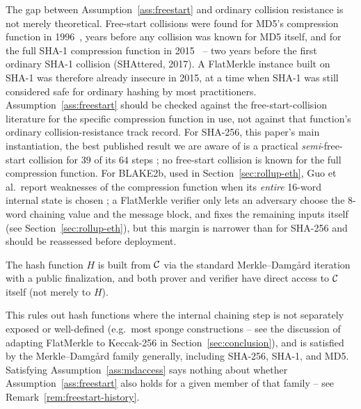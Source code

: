\begin{remark}
\label{rem:freestart-history}
The gap between Assumption~\ref{ass:freestart} and ordinary collision
resistance is not merely theoretical. Free-start collisions were found for
MD5's compression function in 1996~\citep{dobbertin1996}, years before any
collision was known for MD5 itself, and for the full SHA-1 compression
function in 2015~\citep{stevens2015shappening} -- two years before the
first ordinary SHA-1 collision (SHAttered, 2017). A FlatMerkle instance
built on SHA-1 was therefore already insecure in 2015, at a time when
SHA-1 was still considered safe for ordinary hashing by most practitioners.
Assumption~\ref{ass:freestart} should be checked against the
free-start-collision literature for the specific compression function in
use, not against that function's ordinary collision-resistance track
record. For SHA-256, this paper's main instantiation, the best published
result we are aware of is a practical \emph{semi}-free-start collision
for $39$ of its $64$ steps \citep{li2024sha2}; no free-start collision is
known for the full compression function. For BLAKE2b, used in
Section~\ref{sec:rollup-eth}, Guo et al.\ report weaknesses of the
compression function when its \emph{entire} 16-word internal state is
chosen \citep{guo2013blake2}; a FlatMerkle verifier only lets an adversary
choose the 8-word chaining value and the message block, and fixes the
remaining inputs itself (see Section~\ref{sec:rollup-eth}), but this
margin is narrower than for SHA-256 and should be reassessed before
deployment.
\end{remark}

\begin{assumption}
\label{ass:mdaccess}
The hash function $H$ is built from $\mathcal{C}$ via the standard Merkle--Damg\aa rd
iteration with a public finalization, and both prover and verifier have
direct access to $\mathcal{C}$ itself (not merely to $H$).
\end{assumption}

This rules out hash functions where the internal chaining step is not
separately exposed or well-defined (e.g.\ most sponge constructions --
see the discussion of adapting FlatMerkle to Keccak-256 in
Section~\ref{sec:conclusion}), and is satisfied by the Merkle--Damg\aa rd
family generally, including SHA-256, SHA-1, and MD5. Satisfying
Assumption~\ref{ass:mdaccess} says nothing about whether
Assumption~\ref{ass:freestart} also holds for a given member of that
family -- see Remark~\ref{rem:freestart-history}.

